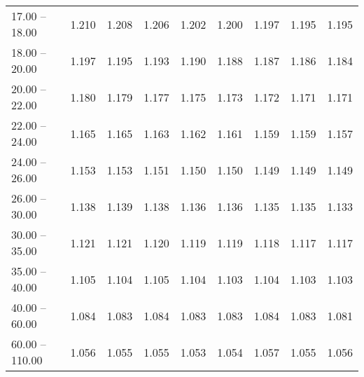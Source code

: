 \begin{table}[htp]
\begin{tiny}
\begin{center}
\begin{tabular}{|l|c|c|c|c|c|c|c|c|}
      17.00 -- 18.00 &  1.210 & 1.208 & 1.206 & 1.202 & 1.200 & 1.197 & 1.195 & 1.195 \\ 
      18.00 -- 20.00 &  1.197 & 1.195 & 1.193 & 1.190 & 1.188 & 1.187 & 1.186 & 1.184 \\ 
      20.00 -- 22.00 &  1.180 & 1.179 & 1.177 & 1.175 & 1.173 & 1.172 & 1.171 & 1.171 \\ 
      22.00 -- 24.00 &  1.165 & 1.165 & 1.163 & 1.162 & 1.161 & 1.159 & 1.159 & 1.157 \\ 
      24.00 -- 26.00 &  1.153 & 1.153 & 1.151 & 1.150 & 1.150 & 1.149 & 1.149 & 1.149 \\ 
      26.00 -- 30.00 &  1.138 & 1.139 & 1.138 & 1.136 & 1.136 & 1.135 & 1.135 & 1.133 \\ 
      30.00 -- 35.00 &  1.121 & 1.121 & 1.120 & 1.119 & 1.119 & 1.118 & 1.117 & 1.117 \\ 
      35.00 -- 40.00 &  1.105 & 1.104 & 1.105 & 1.104 & 1.103 & 1.104 & 1.103 & 1.103 \\ 
      40.00 -- 60.00 &  1.084 & 1.083 & 1.084 & 1.083 & 1.083 & 1.084 & 1.083 & 1.081 \\ 
      60.00 -- 110.00 &  1.056 & 1.055 & 1.055 & 1.053 & 1.054 & 1.057 & 1.055 & 1.056 \\ 
\hline
\end{tabular} 
             \end{center} 
             \end{tiny} 
             \label{tab:sa_trp0_psi2s8} 
             \end{table}


